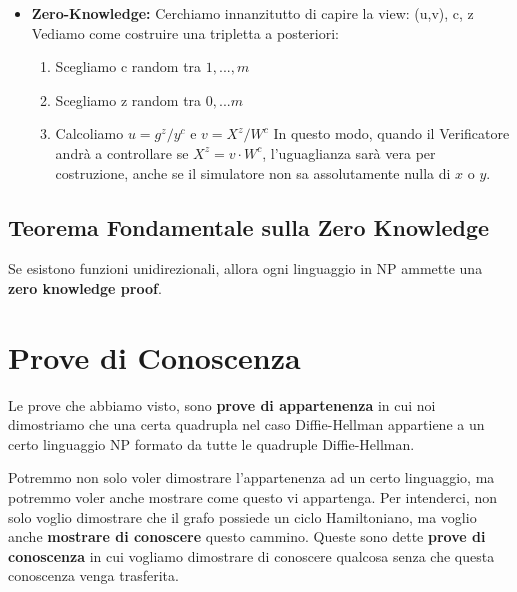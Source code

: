 \begin{itemize}
    Tuttavia, l'attaccante deve inviare $u$ e $v$ (e quindi fissare $\alpha$ e $\beta$) al passo 1, prima che il Verifier scelga $c$ al passo 2. Poiché $c$ è scelto uniformemente a caso tra $m$ valori possibili, la probabilità che l'attaccante abbia scelto i valori di impegno corretti per "indovinare" l'unica sfida possibile è esattamente:
    \[Pr[\text{Successo dell'attaccante}] = \frac{1}{m}\]
    Dato che $m$ è un numero estremamente grande, questa probabilità è trascurabile, garantendo così la proprietà di Soundness.
    \item \textbf{Zero-Knowledge:} Cerchiamo innanzitutto di capire la view: (u,v), c, z 
    Vediamo come costruire una tripletta a posteriori:
    \begin{enumerate}
        \item Scegliamo c random tra $1, ..., m$
        \item Scegliamo z random tra $0, ... m$
        \item Calcoliamo $u = g^z/ y^c$ e $v = X^z/W^c$ In questo modo, quando il Verificatore andrà a controllare se $X^z = v \cdot W^c$, l'uguaglianza sarà vera per costruzione, anche se il simulatore non sa assolutamente nulla di $x$ o $y$.
    \end{enumerate}
\end{itemize}

\subsection*{Teorema Fondamentale sulla Zero Knowledge}
Se esistono funzioni unidirezionali, allora ogni linguaggio in NP ammette una \textbf{zero knowledge proof}. 

\section{Prove di Conoscenza}
Le prove che abbiamo visto, sono \textbf{prove di appartenenza} in cui noi dimostriamo che una certa quadrupla nel caso Diffie-Hellman appartiene a un certo linguaggio NP formato da tutte le quadruple Diffie-Hellman. 

Potremmo non solo voler dimostrare l'appartenenza ad un certo linguaggio, ma potremmo voler anche mostrare come questo vi appartenga. Per intenderci, non solo voglio dimostrare che il grafo possiede un ciclo Hamiltoniano, ma voglio anche \textbf{mostrare di conoscere} questo cammino. Queste sono dette \textbf{prove di conoscenza} in cui vogliamo dimostrare di conoscere qualcosa senza che questa conoscenza venga trasferita. 

